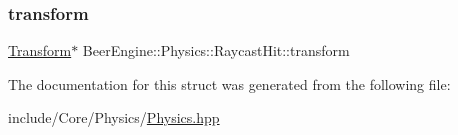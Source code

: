 \subsubsection{\texorpdfstring{transform}{transform}}
{\footnotesize\ttfamily \mbox{\hyperlink{class_beer_engine_1_1_transform}{Transform}}$\ast$ Beer\+Engine\+::\+Physics\+::\+Raycast\+Hit\+::transform}



The documentation for this struct was generated from the following file\+:\begin{DoxyCompactItemize}
\item 
include/\+Core/\+Physics/\mbox{\hyperlink{_physics_8hpp}{Physics.\+hpp}}\end{DoxyCompactItemize}
